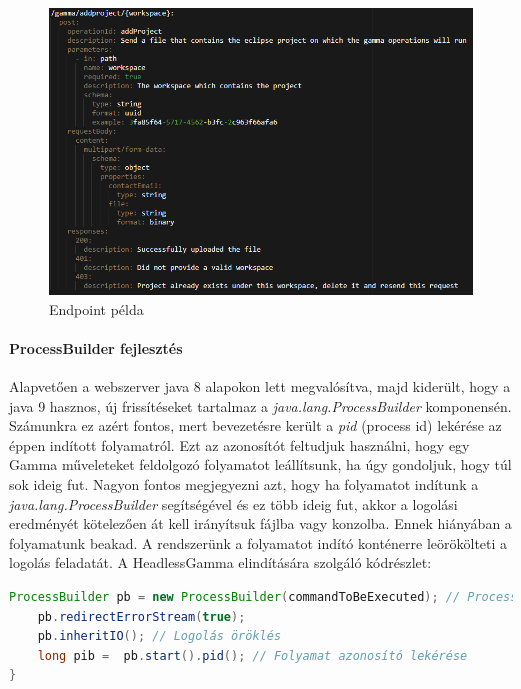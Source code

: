 \begin{figure}[!ht]
	\includegraphics[width=150mm, keepaspectratio]{figures/endpoint_example.png}
	\caption{Endpoint példa}
	\label{fig:endpoint_example}
\end{figure}

\paragraph{ProcessBuilder fejlesztés} Alapvetően a webszerver java 8 alapokon lett megvalósítva, majd kiderült, hogy a java 9 hasznos, új frissítéseket tartalmaz a \textit{java.lang.ProcessBuilder} komponensén. Számunkra ez azért fontos, mert bevezetésre került a \textit{pid} (process id) lekérése az éppen indított folyamatról. Ezt az azonosítót feltudjuk használni, hogy egy Gamma műveleteket feldolgozó folyamatot leállítsunk, ha úgy gondoljuk, hogy túl sok ideig fut.
Nagyon fontos megjegyezni azt, hogy ha folyamatot indítunk a \textit{java.lang.ProcessBuilder} segítségével és ez több ideig fut, akkor a logolási eredményét kötelezően át kell irányítsuk fájlba vagy konzolba. Ennek hiányában a folyamatunk beakad. A rendszerünk a folyamatot indító konténerre leörökölteti a logolás feladatát. A HeadlessGamma elindítására szolgáló kódrészlet:

\begin{lstlisting}[language=Java]
	ProcessBuilder pb = new ProcessBuilder(commandToBeExecuted); // ProcessBuilder inicializálás, commandToBeExecuted a futtatni kivánt parancs karakterláncát tartalmazza
	pb.redirectErrorStream(true);
	pb.inheritIO(); // Logolás öröklés
	long pib =  pb.start().pid(); // Folyamat azonosító lekérése
}
\end{lstlisting}



